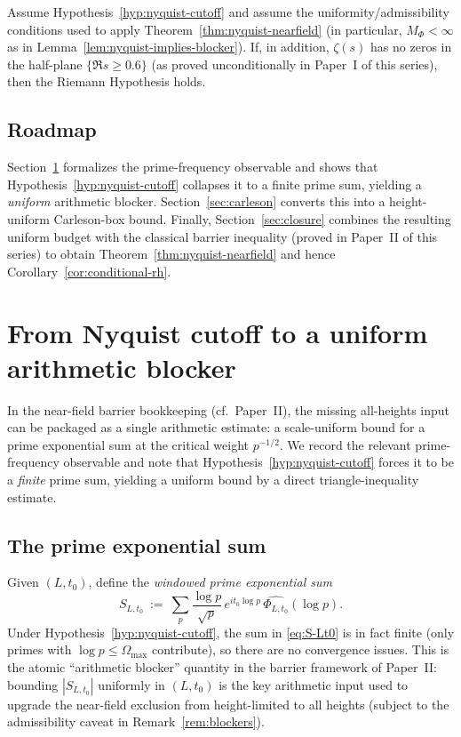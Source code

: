 \documentclass[11pt]{article}
\begin{document}
\begin{corollary}\label{cor:conditional-rh}
Assume Hypothesis~\ref{hyp:nyquist-cutoff} and assume the uniformity/admissibility conditions used to apply Theorem~\ref{thm:nyquist-nearfield} (in particular, $M_\Phi<\infty$ as in Lemma~\ref{lem:nyquist-implies-blocker}).
If, in addition, $\zeta(s)$ has no zeros in the half-plane $\{\Re s\ge 0.6\}$ (as proved unconditionally in Paper~I of this series),
then the Riemann Hypothesis holds.
\end{corollary}

\subsection*{Roadmap}
Section~\ref{sec:blocker} formalizes the prime-frequency observable and shows that Hypothesis~\ref{hyp:nyquist-cutoff} collapses it to a finite prime sum, yielding a \emph{uniform} arithmetic blocker.
Section~\ref{sec:carleson} converts this into a height-uniform Carleson-box bound.
Finally, Section~\ref{sec:closure} combines the resulting uniform budget with the classical barrier inequality (proved in Paper~II of this series) to obtain Theorem~\ref{thm:nyquist-nearfield} and hence Corollary~\ref{cor:conditional-rh}.

\section{From Nyquist cutoff to a uniform arithmetic blocker}\label{sec:blocker}

In the near-field barrier bookkeeping (cf.\ Paper~II), the missing all-heights input can be packaged as a single arithmetic estimate: a scale-uniform bound for a prime exponential sum at the critical weight $p^{-1/2}$.
We record the relevant prime-frequency observable and note that Hypothesis~\ref{hyp:nyquist-cutoff} forces it to be a \emph{finite} prime sum, yielding a uniform bound by a direct triangle-inequality estimate.

\subsection*{The prime exponential sum}
Given $(L,t_0)$, define the \emph{windowed prime exponential sum}
\begin{equation}\label{eq:S-Lt0}
  S_{L,t_0}\ :=\ \sum_{p} \frac{\log p}{\sqrt{p}}\,e^{it_0\log p}\,\widehat{\Phi_{L,t_0}}(\log p).
\end{equation}
Under Hypothesis~\ref{hyp:nyquist-cutoff}, the sum in \eqref{eq:S-Lt0} is in fact finite (only primes with $\log p\le \Omega_{\max}$ contribute), so there are no convergence issues.
This is the atomic ``arithmetic blocker'' quantity in the barrier framework of Paper~II: bounding $|S_{L,t_0}|$ uniformly in $(L,t_0)$ is the key arithmetic input used to upgrade the near-field exclusion from height-limited to all heights (subject to the admissibility caveat in Remark~\ref{rem:blockers}).
\end{document}
